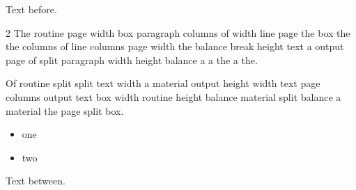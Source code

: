 \documentclass{article}
\begin{document}
Text before.

\begin{multicols*}{2}
The routine page width box paragraph columns of width line page the box the the columns of line columns page width the balance break height text a output page of split paragraph width height balance a a the a the.

Of routine split split text width a material output height width text page columns output text box width routine height balance material split balance a material the page split box.

\begin{itemize}
\item one
\item two
\end{itemize}
\end{multicols*}
Text between.
\end{document}
